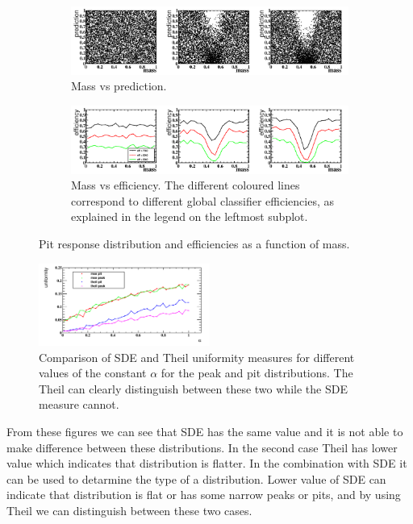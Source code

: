 \begin{figure}[H]
\label{fig:pitdists}
\centering
		\begin{subfigure}[b]{0.95\textwidth}
			\includegraphics[width=\textwidth]{graphs/PitDistributions.png}
			\caption{Mass vs prediction.}
		\end{subfigure}
		\begin{subfigure}[b]{0.95\textwidth}
			\includegraphics[width=\textwidth]{graphs/PitEffs.png}
			\caption{Mass vs efficiency. The different coloured lines correspond to
different global classifier efficiencies, as explained in the legend on the leftmost subplot.}
		\end{subfigure}
		\caption{Pit response distribution and efficiencies as a function of mass.}
\end{figure}

\begin{figure}[H]
\centering
	\includegraphics[width=0.5\textwidth]{graphs/TheilVsMSE.png}
	\caption{Comparison of SDE and Theil uniformity measures for different values of the constant $\alpha$ for the peak and pit distributions.
The Theil can clearly distinguish between these two while the SDE measure cannot.}
\end{figure}

From these figures we can see that SDE has the same value and it is not able to make difference between these distributions. In the second case Theil has lower value which indicates that distribution is flatter. In the combination with SDE it can be used to detarmine the type of a distribution. Lower value of SDE can indicate that distribution is flat or has some narrow peaks or pits, and by using Theil we can distinguish between these two cases.

